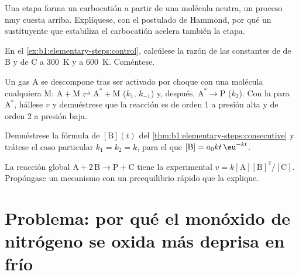 \begin{exercise}[$\star\star$]\label{exo:b1:elementary-steps:8}
Una etapa forma un carbocatión a partir de una molécula neutra, un
proceso muy cuesta arriba. Explíquese, con el postulado de Hammond, por
qué un sustituyente que estabiliza el carbocatión acelera también la
etapa.
\end{exercise}

\begin{exercise}[$\star\star$]\label{exo:b1:elementary-steps:9}
En el \cref{ex:b1:elementary-steps:control}, calcúlese la razón de las
constantes de  de B y de C a \qty{300}{K} y a
\qty{600}{K}. Coméntese.
\end{exercise}

\begin{exercise}[$\star\star\star$]\label{exo:b1:elementary-steps:10}
Un gas $\mathrm{A}$ se descompone tras ser activado por choque con una
molécula cualquiera $\mathrm{M}$: $\mathrm{A} + \mathrm{M} \rightleftharpoons
\mathrm{A}^* + \mathrm{M}$ ($k_1$, $k_{-1}$) y, después, $\mathrm{A}^* \to
\mathrm{P}$ ($k_2$). Con la  para
$\mathrm{A}^*$, hállese $v$ y demuéstrese que la reacción es de orden 1 a
presión alta y de orden 2 a presión baja.
\end{exercise}

\begin{exercise}[$\star\star\star$]\label{exo:b1:elementary-steps:11}
Demuéstrese la fórmula de $[\mathrm{B}](t)$ del
\cref{thm:b1:elementary-steps:consecutive} y trátese el caso particular
$k_1 = k_2 = k$, para el que $[\mathrm{B}] = a_0kt\,\eu^{-kt}$.
\end{exercise}

\begin{exercise}[$\star\star\star$]\label{exo:b1:elementary-steps:12}
La reacción global $\mathrm{A} + 2\,\mathrm{B} \to \mathrm{P} +
\mathrm{C}$ tiene la  experimental $v =
k[\mathrm{A}][\mathrm{B}]^2/[\mathrm{C}]$. Propóngase un mecanismo con un
preequilibrio rápido que la explique.
\end{exercise}

\section{Problema: por qué el monóxido de nitrógeno se oxida más deprisa en frío}


